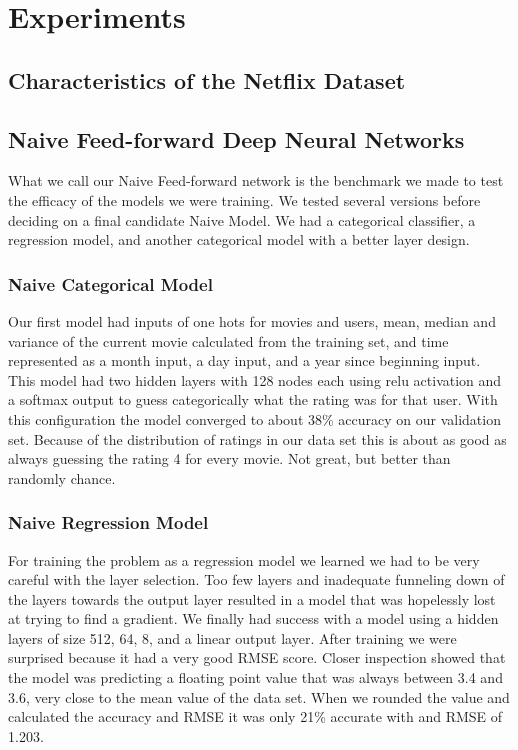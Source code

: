 \section{Experiments}
\subsection{Characteristics of the Netflix Dataset}
\subsection{Naive Feed-forward Deep Neural Networks}

What we call our Naive Feed-forward network is the benchmark we made to test the efficacy of the models we were training. We tested several versions before deciding on a final candidate Naive Model. We had a categorical classifier, a regression model, and another categorical model with a better layer design.

\subsubsection{Naive Categorical Model} 

Our first model had inputs of one hots for movies and users, mean, median and variance of the current movie calculated from the training set, and time represented as a month input, a day input, and a year since beginning input. This model had two hidden layers with 128 nodes each using relu activation and a softmax output to guess categorically what the rating was for that user. With this configuration the model converged to about 38\% accuracy on our validation set. Because of the distribution of ratings in our data set this is about as good as always guessing the rating 4 for every movie. Not great, but better than randomly chance.

\subsubsection{Naive Regression Model}

For training the problem as a regression model we learned we had to be very careful with the layer selection. Too few layers and inadequate funneling down of the layers towards the output layer resulted in a model that was hopelessly lost at trying to find a gradient. We finally had success with a model using a hidden layers of size 512, 64, 8, and a linear output layer. After training we were surprised  because it had a very good RMSE score. Closer inspection showed that the model was predicting a floating point value that was always between 3.4 and 3.6, very close to the mean value of the data set. When we rounded the value and calculated the accuracy and RMSE it was only 21\% accurate with and RMSE of 1.203.

